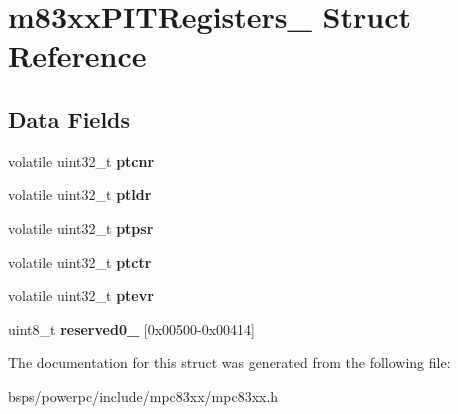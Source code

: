 \hypertarget{structm83xxPITRegisters__}{}\section{m83xx\+P\+I\+T\+Registers\+\_\+ Struct Reference}
\label{structm83xxPITRegisters__}
\subsection*{Data Fields}
\begin{DoxyCompactItemize}
\item 
\mbox{\label{structm83xxPITRegisters___a4593e6e72d7b2ba0ea0b2b4c698350be}} 
volatile uint32\+\_\+t {\bfseries ptcnr}
\item 
\mbox{\label{structm83xxPITRegisters___aa2d9e25f3c3c93adca87e59c9e86739e}} 
volatile uint32\+\_\+t {\bfseries ptldr}
\item 
\mbox{\label{structm83xxPITRegisters___aa230bbafde92d14e76add7d0f78ada72}} 
volatile uint32\+\_\+t {\bfseries ptpsr}
\item 
\mbox{\label{structm83xxPITRegisters___a11abf62414e368c0a7d71f848a255e90}} 
volatile uint32\+\_\+t {\bfseries ptctr}
\item 
\mbox{\label{structm83xxPITRegisters___a289788393d8cf5541375536a3434d2fe}} 
volatile uint32\+\_\+t {\bfseries ptevr}
\item 
\mbox{\label{structm83xxPITRegisters___ae4492762ad8b0de17862d2f8806b7afe}} 
uint8\+\_\+t {\bfseries reserved0\+\_} \mbox{[}0x00500-\/0x00414\mbox{]}
\end{DoxyCompactItemize}


The documentation for this struct was generated from the following file\+:\begin{DoxyCompactItemize}
\item 
bsps/powerpc/include/mpc83xx/mpc83xx.\+h\end{DoxyCompactItemize}
